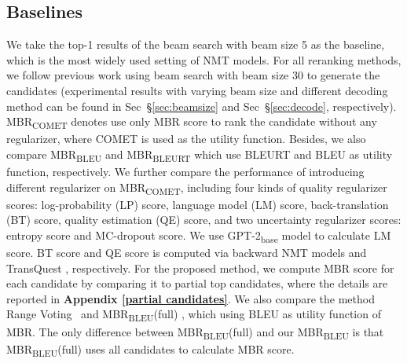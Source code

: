 \documentclass{article}
\begin{document}
\subsection{Baselines}
\label{baseline}
We take the top-1 results of the beam search with beam size 5 as the baseline, which is the most widely used setting of NMT models. For all reranking methods, we follow previous work \cite{30} using beam search with beam size 30 to generate the candidates (experimental results with varying beam size and different decoding method can be found in Sec~\S\ref{sec:beamsize} and Sec~\S\ref{sec:decode}, respectively).  MBR\textsubscript{COMET} denotes use only MBR score to rank the candidate without any regularizer, where COMET is used as the utility function. Besides, we also compare MBR\textsubscript{BLEU} and MBR\textsubscript{BLEURT} which use BLEURT and BLEU as utility function, respectively. We further compare the performance of introducing different regularizer on MBR\textsubscript{COMET}, including four kinds of quality regularizer scores: log-probability (LP) score, language model (LM) score, back-translation (BT) score, quality estimation (QE) score, and two uncertainty regularizer scores: entropy score and MC-dropout score. We use GPT-2\textsubscript{base} model \cite{51} to calculate LM score. BT score and QE score is computed via backward NMT models and TransQuest \cite{50}, respectively. For the proposed method, we compute MBR score for each candidate by comparing it to partial top candidates, where the details are reported in \textbf{Appendix \ref{partial candidates}}. We also compare the method Range Voting~\cite{29} and MBR\textsubscript{BLEU}(full) \cite{20}, which using BLEU as utility function of MBR. The only difference between MBR\textsubscript{BLEU}(full) \cite{20} and our MBR\textsubscript{BLEU} is that MBR\textsubscript{BLEU}(full) uses all candidates to calculate MBR score.


\end{document}
